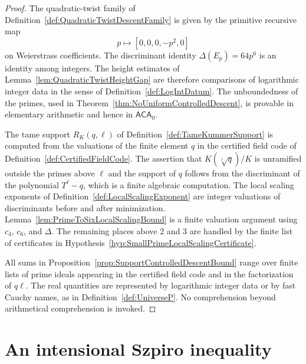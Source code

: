 \documentclass[10pt, reqno]{amsart}
\theoremstyle{plain}
\theoremstyle{definition}
\theoremstyle{plain}
\begin{document}
\begin{proof}
The quadratic-twist family of Definition~\ref{def:QuadraticTwistDescentFamily} is given by the primitive recursive map
\[
  p\longmapsto [0,0,0,-p^{2},0]
\]
on Weierstrass coefficients. The discriminant identity $\Delta(E_{p})=64p^{6}$ is an identity among integers. The height estimates of Lemma~\ref{lem:QuadraticTwistHeightGap} are therefore comparisons of logarithmic integer data in the sense of Definition~\ref{def:LogIntDatum}. The unboundedness of the primes, used in Theorem~\ref{thm:NoUniformControlledDescent}, is provable in elementary arithmetic and hence in $\mathsf{ACA}_{0}$.

The tame support $R_{K}(q,\ell)$ of Definition~\ref{def:TameKummerSupport} is computed from the valuations of the finite element $q$ in the certified field code of Definition~\ref{def:CertifiedFieldCode}. The assertion that $K(\sqrt[\ell]{q})/K$ is unramified outside the primes above $\ell$ and the support of $q$ follows from the discriminant of the polynomial $T^{\ell}-q$, which is a finite algebraic computation. The local scaling exponents of Definition~\ref{def:LocalScalingExponent} are integer valuations of discriminants before and after minimization. Lemma~\ref{lem:PrimeToSixLocalScalingBound} is a finite valuation argument using $c_{4}$, $c_{6}$, and $\Delta$. The remaining places above $2$ and $3$ are handled by the finite list of certificates in Hypothesis~\ref{hyp:SmallPrimeLocalScalingCertificate}.

All sums in Proposition~\ref{prop:SupportControlledDescentBound} range over finite lists of prime ideals appearing in the certified field code and in the factorization of $q\ell$. The real quantities are represented by logarithmic integer data or by fast Cauchy names, as in Definition~\ref{def:UniverseP}. No comprehension beyond arithmetical comprehension is invoked.
\end{proof}

\section{An intensional Szpiro inequality}\label{sec:IntensionalSzpiro}
\end{document}
